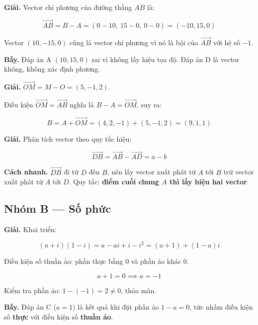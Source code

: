 \documentclass[11pt, a4paper]{article}
\begin{document}
\begin{dapan}[6 — Đáp án B]
\textbf{Giải.} Vector chỉ phương của đường thẳng $AB$ là:

$$\overrightarrow{AB} = B - A = (0 - 10,\ 15 - 0,\ 0 - 0) = (-10, 15, 0)$$

Vector $(10, -15, 0)$ cũng là vector chỉ phương vì nó là bội của $\overrightarrow{AB}$ với hệ số $-1$.

\textbf{Bẫy.} Đáp án A $(10, 15, 0)$ sai vì không lấy hiệu tọa độ. Đáp án D là vector không, không xác định phương.
\end{dapan}

\begin{dapan}[7 — Đáp án B]
\textbf{Giải.} $\overrightarrow{OM} = M - O = (5, -1, 2)$.

Điều kiện $\overrightarrow{OM} = \overrightarrow{AB}$ nghĩa là $B - A = \overrightarrow{OM}$, suy ra:

$$B = A + \overrightarrow{OM} = (4, 2, -1) + (5, -1, 2) = (9, 1, 1)$$
\end{dapan}

\begin{dapan}[8 — Đáp án A]
\textbf{Giải.} Phân tích vector theo quy tắc hiệu:

$$\overrightarrow{DB} = \overrightarrow{AB} - \overrightarrow{AD} = a - b$$

\textbf{Cách nhanh.} $\overrightarrow{DB}$ đi từ $D$ đến $B$, nên lấy vector xuất phát từ $A$ tới $B$ trừ vector xuất phát từ $A$ tới $D$. Quy tắc: \textbf{điểm cuối chung $A$ thì lấy hiệu hai vector}.
\end{dapan}

\subsection*{Nhóm B — Số phức}

\begin{dapan}[9 — Đáp án A]
\textbf{Giải.} Khai triển:

$$(a + i)(1 - i) = a - ai + i - i^2 = (a + 1) + (1 - a)i$$

Điều kiện số thuần ảo: phần thực bằng $0$ và phần ảo khác $0$.

$$a + 1 = 0 \implies a = -1$$

Kiểm tra phần ảo: $1 - (-1) = 2 \ne 0$, thỏa mãn.

\textbf{Bẫy.} Đáp án C ($a = 1$) là kết quả khi đặt phần ảo $1 - a = 0$, tức nhầm điều kiện số \textbf{thực} với điều kiện số \textbf{thuần ảo}.
\end{dapan}
\end{document}
